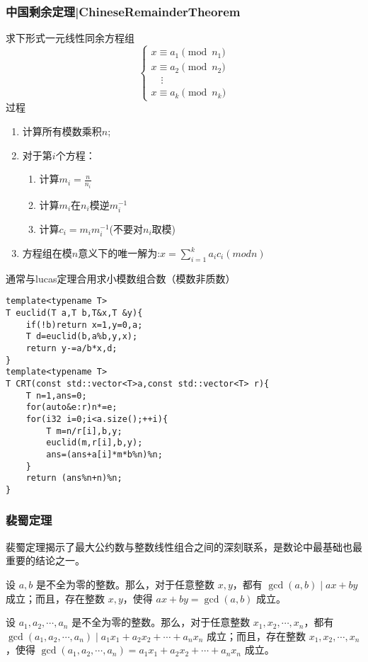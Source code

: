 \documentclass[UTF8]{ctexart}
\begin{document}
\subsubsection{中国剩余定理|ChineseRemainderTheorem}
求下形式一元线性同余方程组
$$
\begin{cases}
    x \equiv a_1 \pmod{n_1} \\
    x \equiv a_2 \pmod{n_2} \\
    \quad \vdots \\
    x \equiv a_k \pmod{n_k}
\end{cases}
$$
过程
\begin{enumerate}
    \item 计算所有模数乘积$n$;
    \item 对于第$i$个方程：
        \begin{enumerate}
            \item 计算$m_i = \frac{n}{n_i}$
            \item 计算$m_i$在$n_i$模逆$m_i^{-1}$
            \item 计算$c_i=m_im_i^{-1}$(不要对$n_i$取模)
        \end{enumerate}
    \item 方程组在模$n$意义下的唯一解为:$x=\sum_{i=1}^{k}a_ic_i(mod n)$
\end{enumerate}
通常与lucas定理合用求小模数组合数（模数非质数）
\begin{lstlisting}
template<typename T>
T euclid(T a,T b,T&x,T &y){
    if(!b)return x=1,y=0,a;
    T d=euclid(b,a%b,y,x);
    return y-=a/b*x,d;
}
template<typename T>
T CRT(const std::vector<T>a,const std::vector<T> r){
    T n=1,ans=0;
    for(auto&e:r)n*=e;
    for(i32 i=0;i<a.size();++i){
        T m=n/r[i],b,y;
        euclid(m,r[i],b,y);
        ans=(ans+a[i]*m*b%n)%n;
    }
    return (ans%n+n)%n;
}
\end{lstlisting}
\subsubsection{裴蜀定理}
裴蜀定理揭示了最大公约数与整数线性组合之间的深刻联系，是数论中最基础也最重要的结论之一。

设 $a,b$ 是不全为零的整数。那么，对于任意整数 $x,y$，都有 $\gcd(a,b)\mid ax+by$ 成立；而且，存在整数 $x,y$，使得 $ax+by=\gcd(a,b)$ 成立。

设 $a_1,a_2,\cdots,a_n$ 是不全为零的整数。那么，对于任意整数 $x_1,x_2,\cdots,x_n$，都有 $\gcd(a_1,a_2,\cdots,a_n)\mid a_1x_1+a_2x_2+\cdots+a_nx_n$ 成立；而且，存在整数 $x_1,x_2,\cdots,x_n$，使得 $\gcd(a_1,a_2,\cdots,a_n)=a_1x_1+a_2x_2+\cdots+a_nx_n$ 成立。
\end{document}
